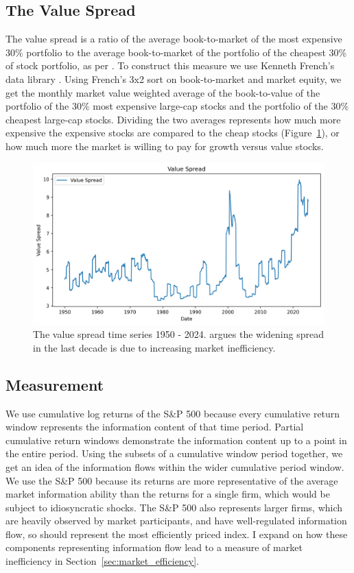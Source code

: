 \subsection{The Value Spread}

The value spread is a ratio of the average book-to-market of the most expensive 30\% portfolio to the average book-to-market of the portfolio of the cheapest 30\% of stock portfolio, as per \citet{fama_french_1993}.
To construct this measure we use Kenneth French's data library \citep{french_website}. 
Using French's 3x2 sort on book-to-market and market equity, we get the monthly market value weighted average of the book-to-value of the portfolio of the 30\% most expensive large-cap stocks and the portfolio of the 30\% cheapest large-cap stocks.
Dividing the two averages represents how much more expensive the expensive stocks are compared to the cheap stocks (Figure~\ref{fig:value_spread}), or how much more the market is willing to pay for growth versus value stocks.

\begin{figure}[h!]
    \centering
    \includegraphics[width=1\textwidth]{../figs/Value Spread.png}
    \caption{The value spread time series 1950 - 2024. \citet{asness_2024} argues the widening spread in the last decade is due to increasing market inefficiency.}
    \label{fig:value_spread}
\end{figure}

\subsection{Measurement}
We use cumulative log returns of the S\&P 500 because every cumulative return window represents the information content of that time period. Partial cumulative return
windows demonstrate the information content up to a point in the entire period. Using the subsets of a cumulative window period together, we get an idea of the
information flows within the wider cumulative period window. We use the S\&P 500 because its returns are more representative of the average market information ability
than the returns for a single firm, which would be subject to idiosyncratic shocks. The S\&P 500 also represents larger firms, which are heavily observed by market participants, and have well-regulated information flow, 
so should represent the most efficiently priced index. I expand on how these components representing information flow lead to a measure of market inefficiency in Section~\ref{sec:market_efficiency}.